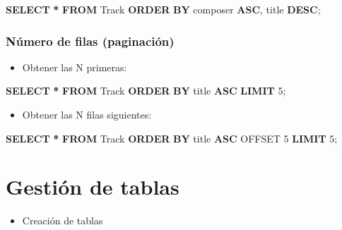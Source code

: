 \documentclass[
]{book}
\newenvironment{Shaded}{\begin{snugshade}}{\end{snugshade}}
\newcommand{\DecValTok}[1]{\textcolor[rgb]{0.00,0.00,0.81}{#1}}
\newcommand{\KeywordTok}[1]{\textcolor[rgb]{0.13,0.29,0.53}{\textbf{#1}}}
\newcommand{\NormalTok}[1]{#1}
\newcommand{\OperatorTok}[1]{\textcolor[rgb]{0.81,0.36,0.00}{\textbf{#1}}}
\providecommand{\tightlist}{%
  \setlength{\itemsep}{0pt}\setlength{\parskip}{0pt}}
\begin{document}
\begin{Shaded}
\begin{Highlighting}[]
  \KeywordTok{SELECT} \OperatorTok{*} \KeywordTok{FROM}\NormalTok{ Track}
  \KeywordTok{ORDER} \KeywordTok{BY}\NormalTok{ composer }\KeywordTok{ASC}\NormalTok{, title }\KeywordTok{DESC}\NormalTok{; }
\end{Highlighting}
\end{Shaded}

\subsubsection{Número de filas (paginación)}\label{nuxfamero-de-filas-paginaciuxf3n}

\begin{itemize}
\tightlist
\item
  Obtener las N primeras:
\end{itemize}

\begin{Shaded}
\begin{Highlighting}[]
  \KeywordTok{SELECT} \OperatorTok{*} \KeywordTok{FROM}\NormalTok{ Track}
  \KeywordTok{ORDER} \KeywordTok{BY}\NormalTok{ title }\KeywordTok{ASC}
  \KeywordTok{LIMIT} \DecValTok{5}\NormalTok{;}
\end{Highlighting}
\end{Shaded}

\begin{itemize}
\tightlist
\item
  Obtener las N filas siguientes:
\end{itemize}

\begin{Shaded}
\begin{Highlighting}[]
  \KeywordTok{SELECT} \OperatorTok{*} \KeywordTok{FROM}\NormalTok{ Track}
  \KeywordTok{ORDER} \KeywordTok{BY}\NormalTok{ title }\KeywordTok{ASC}
\NormalTok{  OFFSET }\DecValTok{5} \KeywordTok{LIMIT} \DecValTok{5}\NormalTok{;}
\end{Highlighting}
\end{Shaded}

\section{Gestión de tablas}\label{gestiuxf3n-de-tablas}

\begin{itemize}
\tightlist
\item
  Creación de tablas
\end{itemize}
\end{document}
